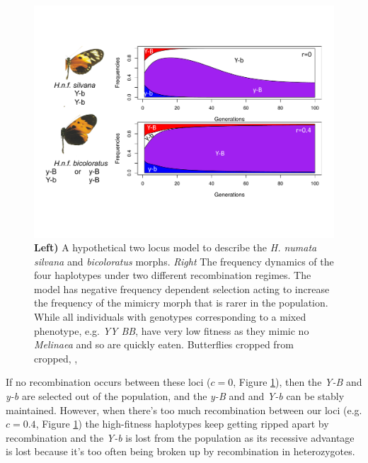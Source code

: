 \begin{figure} %
\begin{center}
 \includegraphics[width = \textwidth]{figures/selection_recom_interaction/H_numata_two_loc_freqs.pdf}
\end{center}
\caption{{\bf Left)} A hypothetical two locus model to describe the {\it H. numata} {\it silvana} and {\it  bicoloratus} morphs. {\it Right} The frequency dynamics of the four haplotypes under two different recombination regimes. The model has negative frequency dependent selection acting to increase the frequency of the mimicry morph that is rarer in the population. While all individuals with genotypes corresponding to a mixed phenotype, e.g. {\it YY BB}, have very low fitness as they mimic no {\it Melinaea} and so are quickly eaten.   Butterflies cropped from \citet{joron2006conserved} cropped, \PLOSccBY,  } \label{fig:numata_two_loc_freqs}  %
\end{figure}

If no recombination occurs between these loci ($c=0$, Figure \ref{fig:numata_two_loc_freqs}), then the {\it Y-B} and {\it y-b} are selected out of the population, and the {\it y-B} and and {\it Y-b} can be stably maintained. However, when there's too much recombination between our loci (e.g. $c=0.4$, Figure \ref{fig:numata_two_loc_freqs}) the high-fitness haplotypes keep getting ripped apart by recombination and the {\it Y-b} is lost from the population as its recessive advantage is lost because it's too often being broken up by recombination in heterozygotes.

